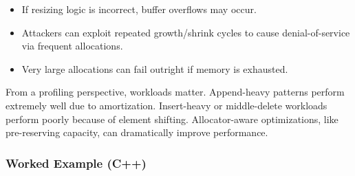 \documentclass[
  letterpaper,
  DIV=11,
  numbers=noendperiod]{scrreprt}
\providecommand{\tightlist}{%
  \setlength{\itemsep}{0pt}\setlength{\parskip}{0pt}}
\begin{document}
\begin{itemize}
\tightlist
\item
  If resizing logic is incorrect, buffer overflows may occur.
\item
  Attackers can exploit repeated growth/shrink cycles to cause
  denial-of-service via frequent allocations.
\item
  Very large allocations can fail outright if memory is exhausted.
\end{itemize}

From a profiling perspective, workloads matter. Append-heavy patterns
perform extremely well due to amortization. Insert-heavy or
middle-delete workloads perform poorly because of element shifting.
Allocator-aware optimizations, like pre-reserving capacity, can
dramatically improve performance.

\subsubsection{Worked Example (C++)}\label{worked-example-c}
\end{document}

